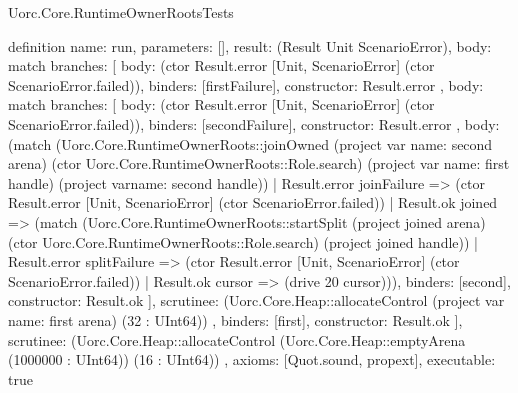 \begin{lexlean}{Uorc.Core.RuntimeOwnerRootsTests}
\begin{semanticmodule}
definition{
  name: run,
  parameters: [],
  result: (Result Unit ScenarioError),
  body: match{
    branches: [
      {
        body: (ctor Result.error [Unit, ScenarioError] (ctor ScenarioError.failed)),
        binders: [firstFailure],
        constructor: Result.error
      },
      {
        body: match{
          branches: [
            {
              body: (ctor Result.error [Unit, ScenarioError] (ctor ScenarioError.failed)),
              binders: [secondFailure],
              constructor: Result.error
            },
            {
              body: (match (Uorc.Core.RuntimeOwnerRoots::joinOwned (project var{
                  name: second
                } arena) (ctor Uorc.Core.RuntimeOwnerRoots::Role.search) (project var{
                  name: first
                } handle) (project var{name: second} handle))
                | Result.error joinFailure => (ctor Result.error [Unit, ScenarioError] (ctor ScenarioError.failed))
                | Result.ok joined => (match (Uorc.Core.RuntimeOwnerRoots::startSplit (project joined arena) (ctor Uorc.Core.RuntimeOwnerRoots::Role.search) (project joined handle))
                  | Result.error splitFailure => (ctor Result.error [Unit, ScenarioError] (ctor ScenarioError.failed))
                  | Result.ok cursor => (drive 20 cursor))),
              binders: [second],
              constructor: Result.ok
            }
          ],
          scrutinee: (Uorc.Core.Heap::allocateControl (project var{
            name: first
          } arena) (32 : UInt64))
        },
        binders: [first],
        constructor: Result.ok
      }
    ],
    scrutinee: (Uorc.Core.Heap::allocateControl (Uorc.Core.Heap::emptyArena (1000000 : UInt64)) (16 : UInt64))
  },
  axioms: [Quot.sound, propext],
  executable: true
}
\end{semanticmodule}
\end{lexlean}
